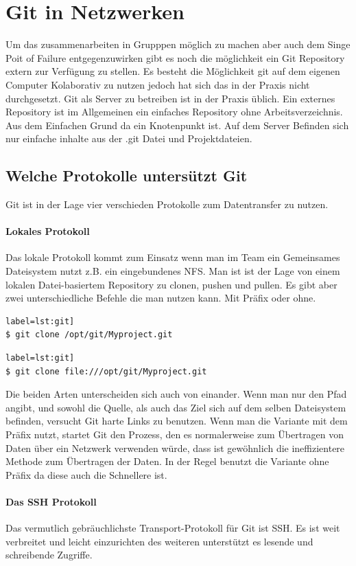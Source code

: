 \documentclass[12pt,a4paper,bibliography=totocnumbered,listof=totocnumbered]{scrartcl}
\begin{document}
\section{Git in Netzwerken}
Um das zusammenarbeiten in Grupppen möglich zu machen aber auch dem Singe Poit of Failure  entgegenzuwirken gibt es noch die möglichkeit  ein Git Repository extern zur Verfügung zu stellen. Es besteht die Möglichkeit git auf dem eigenen Computer Kolaborativ zu nutzen jedoch hat sich das in der Praxis nicht durchgesetzt. Git als Server zu betreiben ist in der Praxis üblich. Ein externes Repository  ist im Allgemeinen ein einfaches Repository ohne Arbeitsverzeichnis. 
Aus dem Einfachen Grund da ein Knotenpunkt ist. Auf dem Server Befinden sich nur einfache inhalte aus der .git Datei und Projektdateien.

\subsection{Welche Protokolle untersützt Git}
Git ist in der Lage vier verschieden Protokolle zum Datentransfer zu nutzen.
\paragraph{Lokales Protokoll}
Das lokale Protokoll kommt zum Einsatz wenn man im Team ein Gemeinsames Dateisystem nutzt z.B. ein eingebundenes NFS. Man ist ist der Lage  von einem lokalen Datei-basiertem Repository zu clonen, pushen und pullen. 
Es gibt aber zwei unterschiedliche Befehle die man nutzen kann. Mit Präfix oder ohne.
\begin{lstlisting}[caption=Ohne Präfix] label=lst:git]
$ git clone /opt/git/Myproject.git
\end{lstlisting}

\begin{lstlisting}[caption=Mit Präfix] label=lst:git]
$ git clone file:///opt/git/Myproject.git
\end{lstlisting}
Die beiden Arten unterscheiden sich auch von einander.
Wenn man nur den Pfad angibt, und sowohl die Quelle, als auch das Ziel sich auf dem selben Dateisystem befinden, versucht Git harte Links zu benutzen. Wenn man die Variante mit dem Präfix nutzt, startet Git den Prozess, den es normalerweise zum Übertragen von Daten über ein Netzwerk verwenden würde, dass ist gewöhnlich die ineffizientere Methode zum Übertragen der Daten. In der Regel benutzt die Variante ohne Präfix da diese auch die Schnellere ist.	
\paragraph{Das SSH Protokoll}
Das vermutlich gebräuchlichste Transport-Protokoll für Git ist SSH.
Es ist weit verbreitet und leicht einzurichten des weiteren unterstützt es lesende und schreibende Zugriffe.
\end{document}
